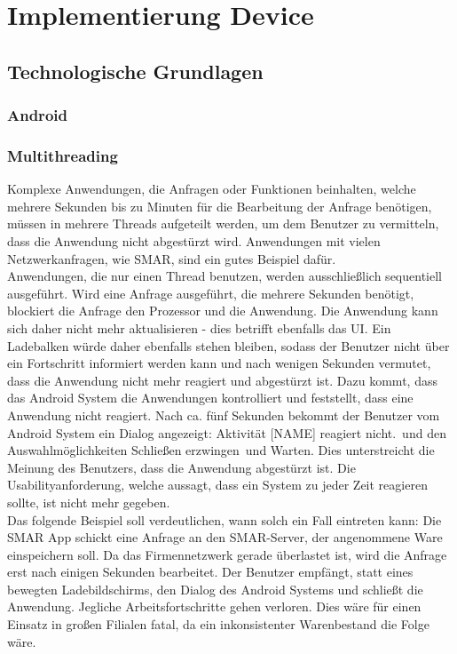\chapter{Implementierung Device}
\label{cha:impl_device}

\section{Technologische Grundlagen}
\subsection{Android}

\subsection{Multithreading}
Komplexe Anwendungen, die Anfragen oder Funktionen beinhalten, welche mehrere Sekunden bis zu Minuten für die Bearbeitung der Anfrage benötigen, müssen in mehrere Threads aufgeteilt werden, um dem Benutzer zu vermitteln, dass die Anwendung nicht abgestürzt wird. Anwendungen mit vielen Netzwerkanfragen, wie \zB \ac{SMAR}, sind ein gutes Beispiel dafür.\\

Anwendungen, die nur einen Thread benutzen, werden ausschließlich sequentiell ausgeführt. Wird eine Anfrage ausgeführt, die mehrere Sekunden benötigt, blockiert die Anfrage den Prozessor und die Anwendung. Die Anwendung kann sich daher nicht mehr aktualisieren - dies betrifft ebenfalls das \ac{UI}. Ein Ladebalken würde daher ebenfalls stehen bleiben, sodass der Benutzer nicht über ein Fortschritt informiert werden kann und nach wenigen Sekunden vermutet, dass die Anwendung nicht mehr reagiert und abgestürzt ist. Dazu kommt, dass das Android System die Anwendungen kontrolliert und feststellt, dass eine Anwendung nicht reagiert. Nach ca. fünf Sekunden bekommt der Benutzer vom Android System ein Dialog angezeigt: \glqq Aktivität [NAME] reagiert nicht.\grqq\ und den Auswahlmöglichkeiten \glqq Schließen erzwingen\grqq\ und \glqq Warten\grqq . Dies unterstreicht die Meinung des Benutzers, dass die Anwendung abgestürzt ist. Die Usabilityanforderung, welche aussagt, dass ein System zu jeder Zeit reagieren sollte, ist nicht mehr gegeben.\\

Das folgende Beispiel soll verdeutlichen, wann solch ein Fall eintreten kann: Die \ac{SMAR} App schickt eine Anfrage an den \ac{SMAR}-Server, der angenommene Ware einspeichern soll. Da das Firmennetzwerk gerade überlastet ist, wird die Anfrage erst nach einigen Sekunden bearbeitet. Der Benutzer empfängt, statt eines bewegten Ladebildschirms, den Dialog des Android Systems und schließt die Anwendung. Jegliche Arbeitsfortschritte gehen verloren. Dies wäre für einen Einsatz in großen Filialen fatal, da ein inkonsistenter Warenbestand die Folge wäre.\\


